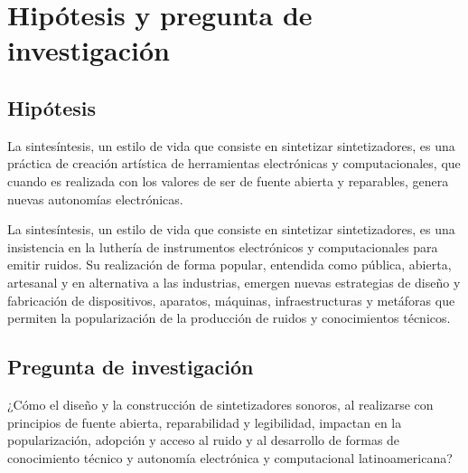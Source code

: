 \documentclass[../proyecto.tex]{subfiles}
\begin{document}
\section{Hipótesis y pregunta de investigación}

\subsection{Hipótesis}

La sintesíntesis, un estilo de vida que consiste en sintetizar sintetizadores, es una práctica de creación artística de herramientas electrónicas y computacionales, que cuando es realizada con los valores de ser de fuente abierta y reparables, genera nuevas autonomías electrónicas.

La sintesíntesis, un estilo de vida que consiste en sintetizar sintetizadores, es una insistencia en la luthería de instrumentos electrónicos y computacionales para emitir ruidos. Su realización de forma popular, entendida como pública, abierta, artesanal y en alternativa a las industrias, emergen nuevas estrategias de diseño y fabricación de dispositivos, aparatos, máquinas, infraestructuras y metáforas que permiten la popularización de la producción de ruidos y conocimientos técnicos.

\subsection{Pregunta de investigación}

¿Cómo el diseño y la construcción de sintetizadores sonoros, al realizarse con principios de fuente abierta, reparabilidad y legibilidad, impactan en la popularización, adopción y acceso al ruido y al desarrollo de formas de conocimiento técnico y autonomía electrónica y computacional latinoamericana?

\end{document}
